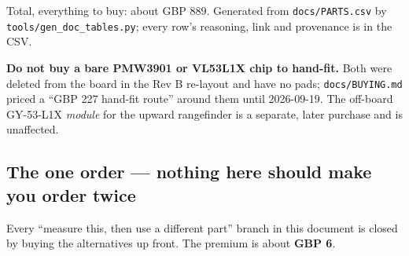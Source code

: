 \documentclass[11pt,a4paper]{article}
\newcommand{\file}[1]{\texttt{\small #1}}
\newcommand{\flag}[1]{\textcolor{warnred}{\textbf{#1}}}
\begin{document}
Total, everything to buy: about GBP 889. Generated from \file{docs/PARTS.csv} by \file{tools/gen\_doc\_tables.py}; every row's reasoning, link and provenance is in the CSV.

\flag{Do not buy a bare PMW3901 or VL53L1X chip to hand-fit.} Both were deleted from the
board in the Rev B re-layout and have no pads; \file{docs/BUYING.md} priced a ``GBP 227
hand-fit route'' around them until 2026-09-19. The off-board GY-53-L1X \emph{module} for the
upward rangefinder is a separate, later purchase and is unaffected.

\subsection{The one order --- nothing here should make you order twice}

Every ``measure this, then use a different part'' branch in this document is closed by
buying the alternatives up front. The premium is about \textbf{GBP 6}.
\end{document}

